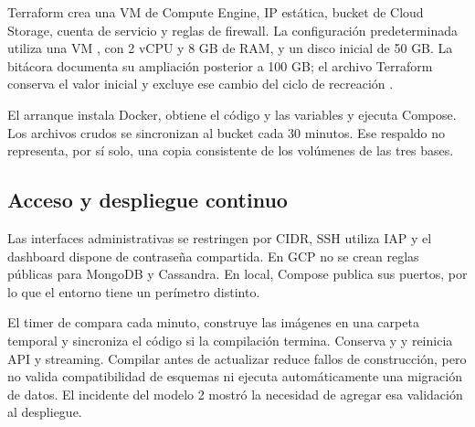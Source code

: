 Terraform crea una VM de Compute Engine, IP estática, bucket de Cloud Storage, cuenta de servicio y reglas de firewall. La configuración predeterminada utiliza una VM , con 2 vCPU y 8 GB de RAM, y un disco inicial de 50 GB. La bitácora documenta su ampliación posterior a 100 GB; el archivo Terraform conserva el valor inicial y excluye ese cambio del ciclo de recreación \cite{bitacora}.

El arranque instala Docker, obtiene el código y las variables y ejecuta Compose. Los archivos crudos se sincronizan al bucket cada 30 minutos. Ese respaldo no representa, por sí solo, una copia consistente de los volúmenes de las tres bases.

\subsection{Acceso y despliegue continuo}
Las interfaces administrativas se restringen por CIDR, SSH utiliza IAP y el dashboard dispone de contraseña compartida. En GCP no se crean reglas públicas para MongoDB y Cassandra. En local, Compose publica sus puertos, por lo que el entorno tiene un perímetro distinto.

El timer de  compara  cada minuto, construye las imágenes en una carpeta temporal y sincroniza el código si la compilación termina. Conserva  y  y reinicia API y streaming. Compilar antes de actualizar reduce fallos de construcción, pero no valida compatibilidad de esquemas ni ejecuta automáticamente una migración de datos. El incidente del modelo 2 mostró la necesidad de agregar esa validación al despliegue.
